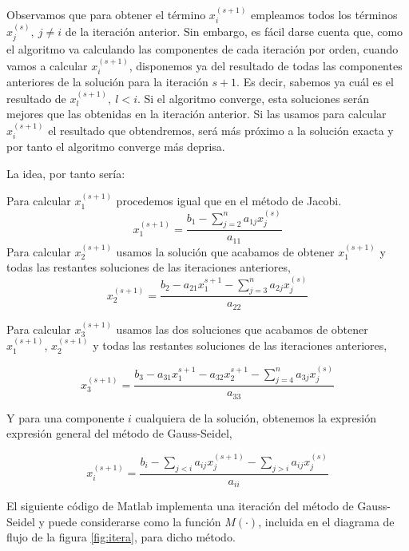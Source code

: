 Observamos que para obtener el término $x_i^{(s+1)}$ empleamos todos los términos $x_j^{(s)}, \ j\neq i$ de la iteración anterior. Sin embargo, es fácil darse cuenta que, como el algoritmo va calculando las componentes de cada iteración por orden, cuando vamos a calcular $x_i^{(s+1)}$, disponemos ya del resultado de todas las componentes anteriores de la solución para la iteración $s+1$. Es decir, sabemos ya cuál es el resultado de $x_l^{(s+1)}, \  l<i$. Si el algoritmo converge, esta soluciones serán mejores que las obtenidas en la iteración anterior. Si las usamos para calcular $x_i^{(s+1)}$ el resultado que obtendremos, será más próximo a la solución exacta y por tanto el algoritmo converge más deprisa.

La idea, por tanto sería: 

Para calcular $x_1^{(s+1)}$ procedemos igual que en el método de Jacobi. 
\begin{equation*}
x_1^{(s+1)}=\frac{b_1-\sum_{j=2}^n a_{1j}x_j^{(s)}}{a_{11}}
\end{equation*}
Para calcular $x_2^{(s+1)}$ usamos la solución que acabamos de obtener  $x_1^{(s+1)}$ y todas las restantes soluciones de las iteraciones anteriores,
\begin{equation*}
x_2^{(s+1)}=\frac{b_2-a_{21}x_1^{s+1}-\sum_{j=3}^na_{2j}x_j^{(s)}}{a_{22}}
\end{equation*}

Para calcular $x_3^{(s+1)}$ usamos las dos soluciones que acabamos de obtener  $x_1^{(s+1)}$, $x_2^{(s+1)}$ y todas las restantes soluciones de las iteraciones anteriores,

\begin{equation*}
x_3^{(s+1)}=\frac{b_3-a_{31}x_1^{s+1}-a_{32}x_2^{s+1}-\sum_{j=4}^na_{3j}x_j^{(s)}}{a_{33}}
\end{equation*}

Y para una componente $i$ cualquiera de la solución, obtenemos la expresión expresión general del método de Gauss-Seidel,
  
\begin{equation*}
x_i^{(s+1)}=\frac{b_i-\sum_{j< i}a_{ij}x_j^{(s+1)}-\sum_{j> i}a_{ij}x_j^{(s)}}{a_{ii}}
\end{equation*}

El siguiente código de Matlab implementa una iteración del método de Gauss-Seidel y puede considerarse como la función $M(\cdot)$, incluida en el diagrama de flujo de la figura \ref{fig:itera}, para dicho método.

